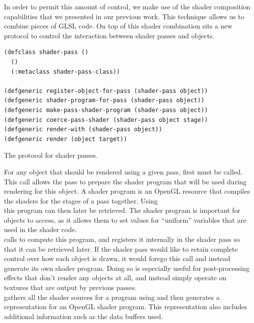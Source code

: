\documentclass[format=sigconf]{acmart}
\begin{document}
In order to permit this amount of control, we make use of the shader composition capabilities that we presented in our previous work\cite{glsloop}. This technique allows us to combine pieces of GLSL code. On top of this shader combination sits a new protocol to control the interaction between shader passes and objects. \\

\begin{listing}[h]
\begin{verbatim}
(defclass shader-pass ()
  ()
  (:metaclass shader-pass-class))

(defgeneric register-object-for-pass (shader-pass object))
(defgeneric shader-program-for-pass (shader-pass object))
(defgeneric make-pass-shader-program (shader-pass object))
(defgeneric coerce-pass-shader (shader-pass object stage))
(defgeneric render-with (shader-pass object))
(defgeneric render (object target))
\end{verbatim}
\caption{The protocol for shader passes.}
\label{lst:pass}
\end{listing}

For any object that should be rendered using a given pass, first  must be called. This call allows the pass to prepare the shader program that will be used during rendering for this object. A shader program is an OpenGL resource that compiles the shaders for the stages of a pass together. Using \\  this program can then later be retrieved. The shader program is important for objects to access, as it allows them to set values for ``uniform'' variables that are used in the shader code. \\

 calls  to compute this program, and registers it internally in the shader pass so that it can be retrieved later. If the shader pass would like to retain complete control over how each object is drawn, it would forego this call and instead generate its own shader program. Doing so is especially useful for post-processing effects that don't render any objects at all, and instead simply operate on textures that are output by previous passes. \\

 gathers all the shader sources for a program using  and then generates a representation for an OpenGL shader program. This representation also includes additional information such as the data buffers used. \\
\end{document}
